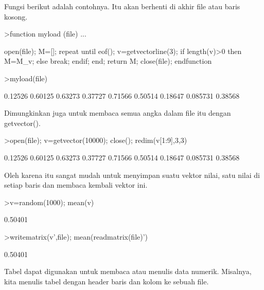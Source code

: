 \documentclass[a4paper,10pt]{article}
\begin{document}
\begin{eulernotebook}
\begin{eulercomment}
\begin{eulercomment}
\begin{eulercomment}
\begin{eulercomment}
\begin{eulercomment}
\begin{eulercomment}
\begin{eulercomment}
\begin{eulercomment}
\begin{eulercomment}
Fungsi berikut adalah contohnya. Itu akan berhenti di akhir file atau
baris kosong.
\end{eulercomment}
\begin{eulerprompt}
>function myload (file) ...
\end{eulerprompt}
\begin{eulerudf}
  open(file);
  M=[];
  repeat
     until eof();
     v=getvectorline(3);
     if length(v)>0 then M=M_v; else break; endif;
  end;
  return M;
  close(file);
  endfunction
\end{eulerudf}
\begin{eulerprompt}
>myload(file)
\end{eulerprompt}
\begin{euleroutput}
    0.12526   0.60125   0.63273 
    0.37727   0.71566   0.50514 
    0.18647  0.085731   0.38568 
\end{euleroutput}
\begin{eulercomment}
Dimungkinkan juga untuk membaca semua angka dalam file itu dengan
getvector().
\end{eulercomment}
\begin{eulerprompt}
>open(file); v=getvector(10000); close(); redim(v[1:9],3,3)
\end{eulerprompt}
\begin{euleroutput}
    0.12526   0.60125   0.63273 
    0.37727   0.71566   0.50514 
    0.18647  0.085731   0.38568 
\end{euleroutput}
\begin{eulercomment}
Oleh karena itu sangat mudah untuk menyimpan suatu vektor nilai, satu
nilai di setiap baris dan membaca kembali vektor ini.
\end{eulercomment}
\begin{eulerprompt}
>v=random(1000); mean(v)
\end{eulerprompt}
\begin{euleroutput}
  0.50401
\end{euleroutput}
\begin{eulerprompt}
>writematrix(v',file); mean(readmatrix(file)')
\end{eulerprompt}
\begin{euleroutput}
  0.50401
\end{euleroutput}
\begin{eulercomment}
Tabel dapat digunakan untuk membaca atau menulis data numerik.
Misalnya, kita menulis tabel dengan header baris dan kolom ke sebuah
file.
\end{eulercomment}

\end{eulercomment}
\end{eulercomment}
\end{eulercomment}
\end{eulercomment}
\end{eulercomment}
\end{eulercomment}
\end{eulercomment}
\end{eulercomment}
\end{eulernotebook}
\end{document}

